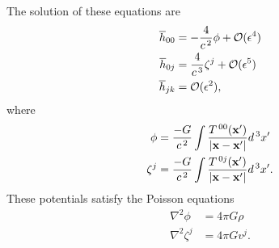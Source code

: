 The solution of these equations are
\begin{subequations}
	\begin{align}
	\label{eq: newpotentialandh00}
 			\overline h_{00} &= -\frac{4}{c^{\hspace{0.05cm}2}}\phi + \mathcal{O}(\epsilon^4) \\
 			\overline h_{0j} &= \frac{4}{c^{\hspace{0.05cm}3}}\zeta^j + \mathcal{O}(\epsilon^5) \\
  			\overline h_{jk} &= \mathcal{O}(\epsilon^2),
	\end{align}
\end{subequations}
where
\begin{subequations}
\begin{align}
 			\phi &= \frac{-G}{c^{\hspace{0.05cm}2}}\int \frac{T^{\hspace{0.05cm}00}(\mathbf{x'})}{|\mathbf{x}-\mathbf{x'}|}d^{\hspace{0.05cm}3}x'\\
	\label{eq: vector potential}
 			\zeta^j &= \frac{-G}{c^{\hspace{0.05cm}2}}\int \frac{T^{\hspace{0.05cm}0j}(\mathbf{x'})}{|\mathbf{x}-\mathbf{x'}|}d^{\hspace{0.05cm}3}x' .
	\end{align}
\end{subequations}
These potentials satisfy the Poisson equations
\begin{align}
\nabla^2 \phi &= 4\pi G\rho\\
\nabla^2 \zeta^j &= 4\pi G v^j.
\end{align}

